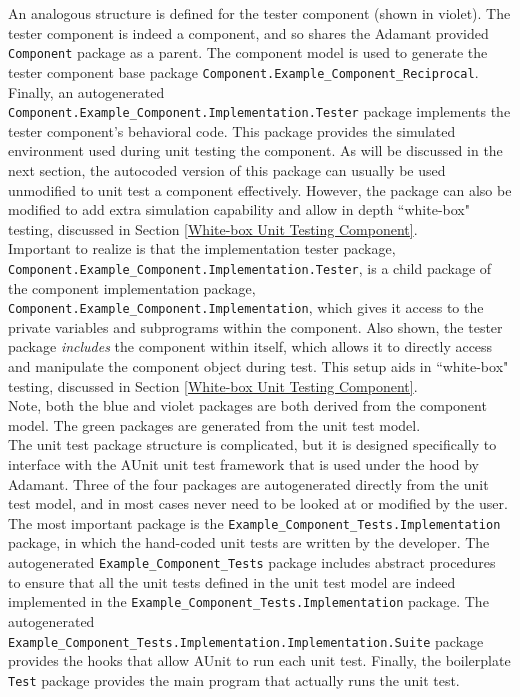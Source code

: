 An analogous structure is defined for the tester component (shown in violet). The tester component is indeed a component, and so shares the Adamant provided \texttt{Component} package as a parent. The component model is used to generate the tester component base package \texttt{Component.Example\_Component\_Reciprocal}. Finally, an autogenerated \texttt{Component.Example\_Component.Implementation.Tester} package implements the tester component's behavioral code. This package provides the simulated environment used during unit testing the component. As will be discussed in the next section, the autocoded version of this package can usually be used unmodified to unit test a component effectively. However, the package can also be modified to add extra simulation capability and allow in depth ``white-box" testing, discussed in Section \ref{White-box Unit Testing Component}. \\

Important to realize is that the implementation tester package, \texttt{Component.Example\_Component.Implementation.Tester}, is a child package of the component implementation package, \texttt{Component.Example\_Component.Implementation}, which gives it access to the private variables and subprograms within the component. Also shown, the tester package \textit{includes} the component within itself, which allows it to directly access and manipulate the component object during test. This setup aids in ``white-box" testing, discussed in Section \ref{White-box Unit Testing Component}. \\

Note, both the blue and violet packages are both derived from the component model. The green packages are generated from the unit test model. \\

The unit test package structure is complicated, but it is designed specifically to interface with the AUnit unit test framework that is used under the hood by Adamant. Three of the four packages are autogenerated directly from the unit test model, and in most cases never need to be looked at or modified by the user. The most important package is the \texttt{Example\_Component\_Tests.Implementation} package, in which the hand-coded unit tests are written by the developer. The autogenerated \texttt{Example\_Component\_Tests} package includes abstract procedures to ensure that all the unit tests defined in the unit test model are indeed implemented in the \texttt{Example\_Component\_Tests.Implementation} package. The autogenerated \texttt{Example\_Component\_Tests.Implementation.Implementation.Suite} package provides the hooks that allow AUnit to run each unit test. Finally, the boilerplate \texttt{Test} package provides the main program that actually runs the unit test. \\

